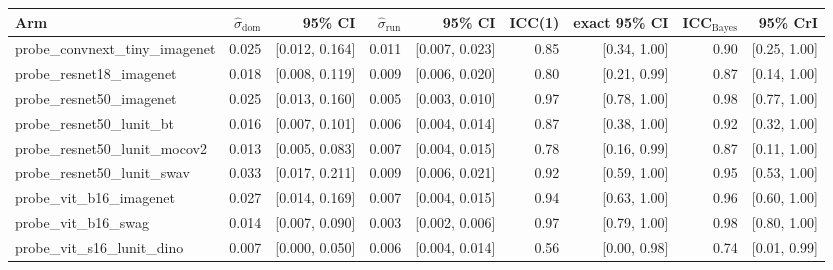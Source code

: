 \begin{tabular}{lrrrrrrrr}
\toprule
Arm & $\hat\sigma_\text{dom}$ & 95\% CI & $\hat\sigma_\text{run}$ & 95\% CI & ICC(1) & exact 95\% CI & ICC$_\text{Bayes}$ & 95\% CrI \\
\midrule
probe\_convnext\_tiny\_imagenet & 0.025 & [0.012, 0.164] & 0.011 & [0.007, 0.023] & 0.85 & [0.34, 1.00] & 0.90 & [0.25, 1.00] \\
probe\_resnet18\_imagenet & 0.018 & [0.008, 0.119] & 0.009 & [0.006, 0.020] & 0.80 & [0.21, 0.99] & 0.87 & [0.14, 1.00] \\
probe\_resnet50\_imagenet & 0.025 & [0.013, 0.160] & 0.005 & [0.003, 0.010] & 0.97 & [0.78, 1.00] & 0.98 & [0.77, 1.00] \\
probe\_resnet50\_lunit\_bt & 0.016 & [0.007, 0.101] & 0.006 & [0.004, 0.014] & 0.87 & [0.38, 1.00] & 0.92 & [0.32, 1.00] \\
probe\_resnet50\_lunit\_mocov2 & 0.013 & [0.005, 0.083] & 0.007 & [0.004, 0.015] & 0.78 & [0.16, 0.99] & 0.87 & [0.11, 1.00] \\
probe\_resnet50\_lunit\_swav & 0.033 & [0.017, 0.211] & 0.009 & [0.006, 0.021] & 0.92 & [0.59, 1.00] & 0.95 & [0.53, 1.00] \\
probe\_vit\_b16\_imagenet & 0.027 & [0.014, 0.169] & 0.007 & [0.004, 0.015] & 0.94 & [0.63, 1.00] & 0.96 & [0.60, 1.00] \\
probe\_vit\_b16\_swag & 0.014 & [0.007, 0.090] & 0.003 & [0.002, 0.006] & 0.97 & [0.79, 1.00] & 0.98 & [0.80, 1.00] \\
probe\_vit\_s16\_lunit\_dino & 0.007 & [0.000, 0.050] & 0.006 & [0.004, 0.014] & 0.56 & [0.00, 0.98] & 0.74 & [0.01, 0.99] \\
\bottomrule
\end{tabular}

